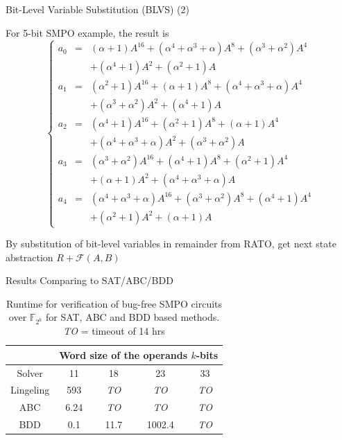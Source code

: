 \documentclass[xcolor=dvipsnames]{beamer}
\newcommand{\Fkk}{{\mathbb{F}}_{2^k}}
\begin{document}
\begin{frame}{\large{Bit-Level Variable Substitution (BLVS) (2)}}
\begin{Example}
For 5-bit SMPO example, the result is
\begin{displaymath}
\left\{
  \begin{array}{lcl}
  a_0 & = & (\alpha+1)A^{16}+(\alpha^4+\alpha^3+\alpha)A^8+(\alpha^3+\alpha^2)A^4\\&&+(\alpha^4+1)A^2+(\alpha^2+1)A\\
  a_1 & = & (\alpha^2+1)A^{16}+(\alpha+1)A^8+(\alpha^4+\alpha^3+\alpha)A^4\\&&+(\alpha^3+\alpha^2)A^2+(\alpha^4+1)A\\
  a_2 & = & (\alpha^4+1)A^{16}+(\alpha^2+1)A^8+(\alpha+1)A^4\\&&+(\alpha^4+\alpha^3+\alpha)A^2+(\alpha^3+\alpha^2)A\\
  a_3 & = & (\alpha^3+\alpha^2)A^{16}+(\alpha^4+1)A^8+(\alpha^2+1)A^4\\&&+(\alpha+1)A^2+(\alpha^4+\alpha^3+\alpha)A\\
  a_4 & = & (\alpha^4+\alpha^3+\alpha)A^{16}+(\alpha^3+\alpha^2)A^8+(\alpha^4+1)A^4\\&&+(\alpha^2+1)A^2+(\alpha+1)A
  \end{array} \right.
\end{displaymath}
\end{Example}
By substitution of bit-level variables in remainder from RATO, get next state abstraction $R+\mathcal F(A,B)$
\end{frame}

\begin{frame}{\large{Results Comparing to SAT/ABC/BDD}}
\begin{table}[H]
\centering
\begin{tabular}{|c||c|c|c|c|} 
\hline
& \multicolumn{4}{|c|}{Word size of the operands $k$-bits}  \\
\hline
Solver & 11 & 18 & 23 & 33 \\
\hline
\hline
Lingeling & 593  & \emph{TO}  & \emph{TO}  & \emph{TO}\\
\hline
\hline
ABC & 6.24 & \emph{TO} & \emph{TO} & \emph{TO}\\
\hline
\hline
BDD & 0.1 & 11.7 & 1002.4 & \emph{TO}  \\
\hline
\end{tabular}
\caption{Runtime for verification of bug-free SMPO circuits over $\Fkk$ for SAT, ABC and BDD based methods. \emph{TO} = timeout of 14 hrs}\label{table:satbdd}  
\end{table}
\end{frame}
\end{document}

